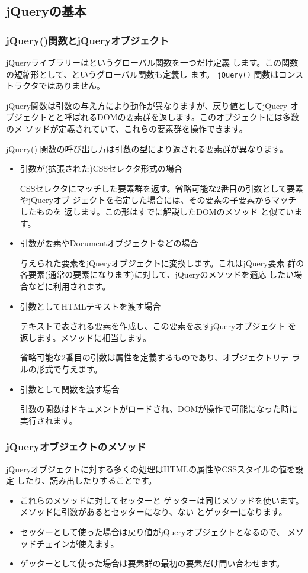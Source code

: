 \subsection{jQueryの基本}
\subsubsection{jQuery()関数とjQueryオブジェクト}
jQueryライブラリーはというグローバル関数を一つだけ定義
します。この関数の短縮形として、\ElmJ{\$}というグローバル関数も定義し
ます。
\texttt{jQuery()} 関数はコンストラクタではありません。

jQuery関数は引数の与え方により動作が異なりますが、戻り値としてjQuery
オブジェクトとと呼ばれるDOMの要素群を返します。このオブジェクトには多数のメ
ソッドが定義されていて、これらの要素群を操作できます。

jQuery() 関数の呼び出し方は引数の型により返される要素群が異なります。
\begin{itemize}
 \item 引数が(拡張された)CSSセレクタ形式の場合

 CSSセレクタにマッチした要素群を返す。省略可能な2番目の引数として要素やjQueryオブ
       ジェクトを指定した場合には、その要素の子要素からマッチしたものを
       返します。この形はすでに解説したDOMのメソッド
       と似ています。
 \item 引数が要素やDocumentオブジェクトなどの場合

       与えられた要素をjQueryオブジェクトに変換します。これはjQuery要素
       群の各要素(通常の要素になります)に対して、jQueryのメソッドを適応
       したい場合などに利用されます。
 \item 引数としてHTMLテキストを渡す場合

       テキストで表される要素を作成し、この要素を表すjQueryオブジェクト
       を返します。メソッドに相当します。

       省略可能な2番目の引数は属性を定義するものであり、オブジェクトリテ
       ラルの形式で与えます。
 \item 引数として関数を渡す場合

       引数の関数はドキュメントがロードされ、DOMが操作で可能になった時に
       実行されます。
\end{itemize}
\subsubsection{jQueryオブジェクトのメソッド}\label{jQueryMethod}
jQueryオブジェクトに対する多くの処理はHTMLの属性やCSSスタイルの値を設定
したり、読み出したりすることです。
\begin{itemize}
 \item これらのメソッドに対してセッターと
ゲッターは同じメソッドを使います。メソッドに引数があるとセッターになり、ない
とゲッターになります。
 \item セッターとして使った場合は戻り値がjQueryオブジェクトとなるので、
       メソッドチェインが使えます。
 \item ゲッターとして使った場合は要素群の最初の要素だけ問い合わせます。
\end{itemize}
